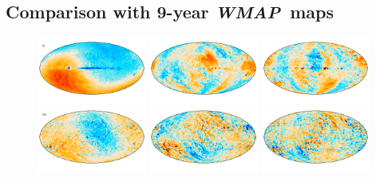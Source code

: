 \documentclass[twocolumn]{../../common/aa}
\def\WMAP{\emph{WMAP}}
\begin{document}
\subsection{Comparison with 9-year \WMAP\ maps}
\label{sec:wmap_comparison}

\begin{figure}
	\centering
	\includegraphics[width=0.32\textwidth]{figures/megadiff_K_I.pdf}
        \includegraphics[width=0.32\textwidth]{figures/megadiff_K_Q.pdf}
        \includegraphics[width=0.32\textwidth]{figures/megadiff_K_U.pdf}\\\vspace*{-4mm}
	\includegraphics[width=0.32\textwidth]{figures/megadiff_Ka_I.pdf}
        \includegraphics[width=0.32\textwidth]{figures/megadiff_Ka_Q.pdf}
        \includegraphics[width=0.32\textwidth]{figures/megadiff_Ka_U.pdf}\\\vspace*{-4mm}

\end{figure}
\end{document}
